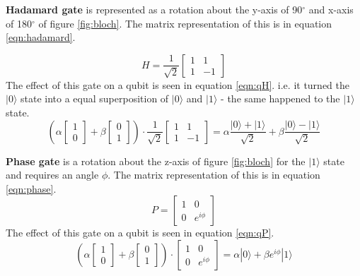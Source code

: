 {\bf Hadamard gate} is represented as a rotation about the y-axis of 90$^\circ$ and x-axis of 180$^\circ$ of figure \ref{fig:bloch}.
The matrix representation of this is in equation \ref{eqn:hadamard}. 

\begin{equation}\label{eqn:hadamard}
    H = \frac{1}{\sqrt{2}} \begin{bmatrix}
1 & 1 \\
1 & -1 
\end{bmatrix}  
\end{equation}
The effect of this gate on a qubit is seen in equation \ref{eqn:qH}.
i.e. it turned the $|0\rangle$ state into a equal superposition of $|0\rangle$ and $|1\rangle$ - the same happened to the $|1\rangle$ state.
\begin{equation}\label{eqn:qH}
    \left( \alpha \begin{bmatrix}
1 \\
0 
\end{bmatrix}  + \beta  \begin{bmatrix}
0 \\
1 
\end{bmatrix}   \right) \cdot \frac{1}{\sqrt{2}} \begin{bmatrix}
1 & 1 \\
1 & -1 
\end{bmatrix} = \alpha \frac{|0\rangle +|1\rangle}{\sqrt{2}} + \beta \frac{|0\rangle - |1\rangle}{\sqrt{2}}
\end{equation}


{\bf Phase gate} is a rotation about the z-axis of figure \ref{fig:bloch} for the $|1\rangle$ state and requires an angle $\phi$. 
The matrix representation of this is in equation \ref{eqn:phase}.
\begin{equation}\label{eqn:phase}
    P =  \begin{bmatrix}
1 & 0 \\
0 & e^{i \phi}
\end{bmatrix}  
\end{equation}
The effect of this gate on a qubit is seen in equation \ref{eqn:qP}.
\begin{equation}\label{eqn:qP}
    \left( \alpha \begin{bmatrix}
1 \\
0 
\end{bmatrix}  + \beta  \begin{bmatrix}
0 \\
1 
\end{bmatrix}   \right) \cdot \begin{bmatrix}
1 & 0 \\
0 & e^{i\phi} 
\end{bmatrix}  = \alpha |0\rangle + \beta e^{i\phi}|1\rangle
\end{equation}

